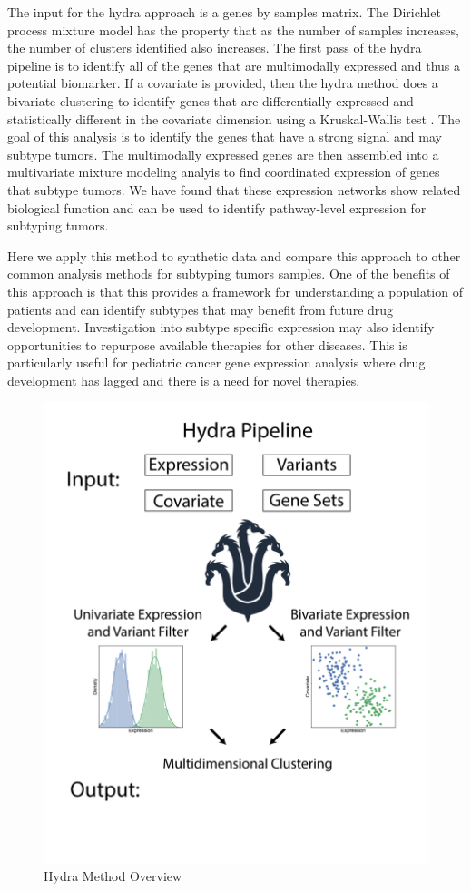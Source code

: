 \documentclass[fleqn,10pt]{wlscirep}
\begin{document}
The input for the hydra approach is a genes by samples matrix. The Dirichlet process mixture model has the property that as the number of samples increases, the number of clusters identified also increases. The first pass of the hydra pipeline is to identify all of the genes that are multimodally expressed and thus a potential biomarker. If a covariate is provided, then the hydra method does a bivariate clustering to identify genes that are differentially expressed and statistically different in the covariate dimension using a Kruskal-Wallis test \cite{mckight2010kruskal}. The goal of this analysis is to identify the genes that have a strong signal and may subtype tumors. The multimodally expressed genes are then assembled into a multivariate mixture modeling analyis to find coordinated expression of genes that subtype tumors. We have found that these expression networks show related biological function and can be used to identify pathway-level expression for subtyping tumors.


Here we apply this method to synthetic data and compare this approach to other common analysis methods for subtyping tumors samples. One of the benefits of this approach is that this provides a framework for understanding a population of patients and can identify subtypes that may benefit from future drug development. Investigation into subtype specific expression may also identify opportunities to repurpose available therapies for other diseases. This is particularly useful for pediatric cancer gene expression analysis where drug development has lagged and there is a need for novel therapies. 

\begin{figure}
	\centering
	\includegraphics[width=0.5\linewidth]{images/hydra-overview@2x.png}
	\caption{Hydra Method Overview}
	\label{sfig:hydra-overview}
\end{figure}
\end{document}
